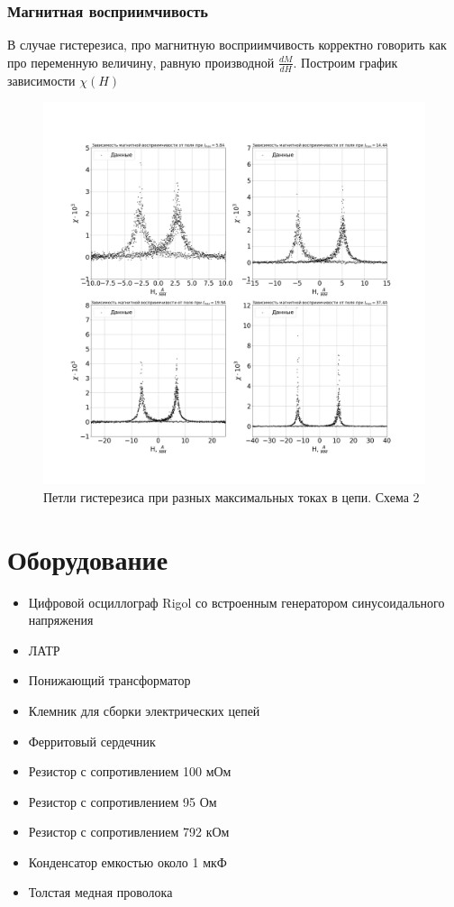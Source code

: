 \documentclass[a4paper,14pt]{extarticle}
\begin{document}
	\subsubsection{Магнитная восприимчивость}
	В случае гистерезиса, про магнитную восприимчивость корректно говорить как про переменную величину, равную производной $\frac{dM}{dH}$. Построим график зависимости $\chi(H)$
	\begin{figure}[h]
		\centering
		\includegraphics[width=1.0\linewidth]{Lab2_5.png}
		\caption{Петли гистерезиса при разных максимальных токах в цепи. Схема 2}
		\label{fig8}
	\end{figure}
	
	\maketitle
	\tableofcontents
	
	\section{Оборудование}
		\begin{itemize}
			\item Цифровой осциллограф Rigol со встроенным генератором синусоидального напряжения
			\item ЛАТР
			\item Понижающий трансформатор
			\item Клемник для сборки электрических цепей
			\item Ферритовый сердечник
			\item Резистор с сопротивлением 100 мОм
			\item Резистор с сопротивлением 95 Ом
			\item Резистор с сопротивлением 792 кОм
			\item Конденсатор емкостью около 1 мкФ
			\item Толстая медная проволока
		\end{itemize}
\end{document}
